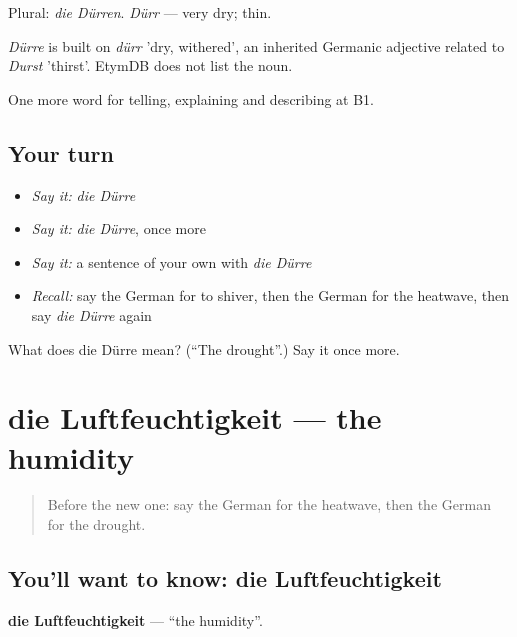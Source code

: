 Plural: \emph{die Dürren}. \emph{Dürr} — very dry; thin.

\begin{cousinweb}
\emph{Dürre} is built on \emph{dürr} 'dry, withered', an inherited Germanic adjective related to \emph{Durst} 'thirst'. EtymDB does not list the noun.
\end{cousinweb}

\begin{grammarlens}[title={What you've built}]
One more word for telling, explaining and describing at B1.
\end{grammarlens}

\subsection*{Your turn}
\begin{itemize}
\raggedright
  \item \emph{Say it:} \emph{die Dürre}
  \item \emph{Say it:} \emph{die Dürre}, once more
  \item \emph{Say it:} a sentence of your own with \emph{die Dürre}
  \item \emph{Recall:} say the German for to shiver, then the German for the heatwave, then say \emph{die Dürre} again
\end{itemize}

\begin{tcolorbox}[breakable,colback=teal!4,colframe=teal!35!black,title={Before you move on}]
What does die Dürre mean? (\textquotedblleft{}The drought\textquotedblright{}.) Say it once more.
\end{tcolorbox}
\section[die Luftfeuchtigkeit]{die Luftfeuchtigkeit — the humidity}

\label{lesson:GE-C464-luftfeuchtigkeit}



\begin{quote}
Before the new one: say the German for the heatwave, then the German for the drought.
\end{quote}

\subsection*{You'll want to know: die Luftfeuchtigkeit}
\textbf{die Luftfeuchtigkeit} — \textquotedblleft{}the humidity\textquotedblright{}.

